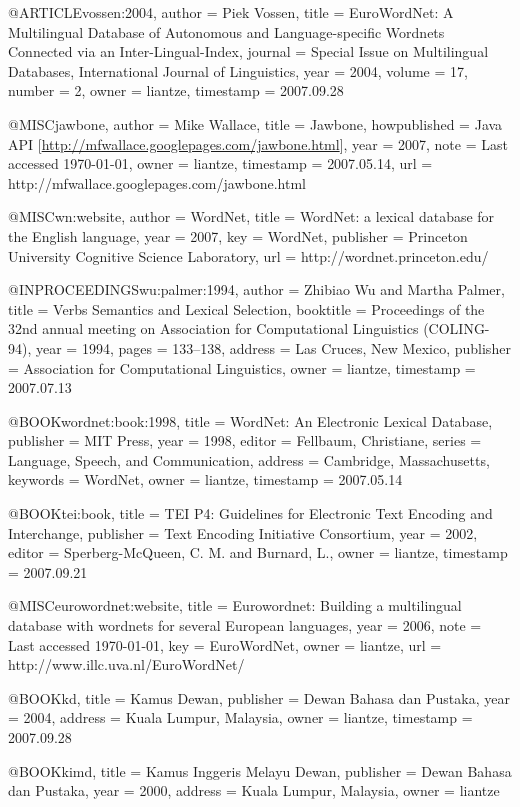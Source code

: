 @ARTICLE{vossen:2004,
  author = {Piek Vossen},
  title = {{EuroWordNet}: A Multilingual Database of Autonomous and Language-specific
	Wordnets Connected via an {Inter-Lingual-Index}},
  journal = {Special Issue on Multilingual Databases, International Journal of
	Linguistics},
  year = {2004},
  volume = {17},
  number = {2},
  owner = {liantze},
  timestamp = {2007.09.28}
}

@MISC{jawbone,
  author = {Mike Wallace},
  title = {Jawbone},
  howpublished = {Java API [\url{http://mfwallace.googlepages.com/jawbone.html}]},
  year = {2007},
  note = {Last accessed \today},
  owner = {liantze},
  timestamp = {2007.05.14},
  url = {http://mfwallace.googlepages.com/jawbone.html}
}

@MISC{wn:website,
  author = {{WordNet}},
  title = {{WordNet}: a lexical database for the {English} language},
  year = {2007},
  key = {{WordNet}},
  publisher = {Princeton University Cognitive Science Laboratory},
  url = {http://wordnet.princeton.edu/}
}

@INPROCEEDINGS{wu:palmer:1994,
  author = {Zhibiao Wu and Martha Palmer},
  title = {Verbs Semantics and Lexical Selection},
  booktitle = {Proceedings of the 32nd annual meeting on Association for Computational
	Linguistics (COLING-94)},
  year = {1994},
  pages = {133--138},
  address = {Las Cruces, New Mexico},
  publisher = {Association for Computational Linguistics},
  owner = {liantze},
  timestamp = {2007.07.13}
}

@BOOK{wordnet:book:1998,
  title = {{WordNet}: An Electronic Lexical Database},
  publisher = {MIT Press},
  year = {1998},
  editor = {Fellbaum, Christiane},
  series = {Language, Speech, and Communication},
  address = {Cambridge, Massachusetts},
  keywords = {WordNet},
  owner = {liantze},
  timestamp = {2007.05.14}
}

@BOOK{tei:book,
  title = {{TEI P4}: Guidelines for Electronic Text Encoding and Interchange},
  publisher = {Text Encoding Initiative Consortium},
  year = {2002},
  editor = {Sperberg-McQueen, C. M. and Burnard, L.},
  owner = {liantze},
  timestamp = {2007.09.21}
}

@MISC{eurowordnet:website,
  title = {Eurowordnet: Building a multilingual database with wordnets for several
	{European} languages},
  year = {2006},
  note = {Last accessed \today},
  key = {EuroWordNet},
  owner = {liantze},
  url = {http://www.illc.uva.nl/EuroWordNet/}
}

@BOOK{kd,
  title = {{Kamus Dewan}},
  publisher = {Dewan Bahasa dan Pustaka},
  year = {2004},
  address = {Kuala Lumpur, Malaysia},
  owner = {liantze},
  timestamp = {2007.09.28}
}

@BOOK{kimd,
  title = {{Kamus Inggeris Melayu Dewan}},
  publisher = {Dewan Bahasa dan Pustaka},
  year = {2000},
  address = {Kuala Lumpur, Malaysia},
  owner = {liantze}
}

